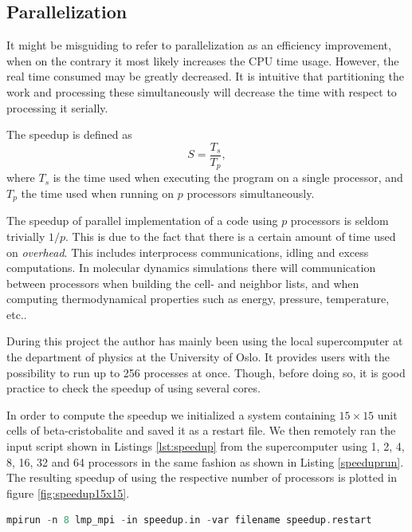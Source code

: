 \documentclass[twoside,english]{uiofysmaster}
\begin{document}
\subsection{Parallelization}
 It might be misguiding to refer to parallelization as an efficiency improvement, when on the contrary it most likely increases the CPU time usage. However, the real time consumed may be greatly decreased. It is intuitive that partitioning the work and processing these simultaneously will decrease the time with respect to processing it serially.   
 
 
 The speedup is defined as 
 \begin{equation}
 S = \frac{T_s}{T_p},
 \end{equation}
 where $T_s$ is the time used when executing the program on a single processor, and $T_p$ the time used when running on $p$ processors simultaneously.
 
 The speedup of parallel implementation of a code using $p$ processors is seldom trivially $1/p$. This is due to the fact that there is a certain amount of time used on \textit{overhead}. This includes interprocess communications, idling and excess computations.
 In molecular dynamics simulations there will communication between processors when building the cell- and neighbor lists, and when computing thermodynamical properties such as energy, pressure, temperature, etc.. 

During this project the author has mainly been using the local supercomputer at the department of physics at the University of Oslo. It provides users with the possibility to run  up to 256 processes at once. Though, before doing so, it is good practice to check the speedup of using several cores.

In order to compute the speedup we initialized a system containing $15\times15$ unit cells of beta-cristobalite and saved it as a restart file. We then remotely ran the input script shown in Listings \ref{lst:speedup} from the supercomputer using 1, 2, 4, 8, 16, 32 and 64 processors in the same fashion as shown in Listing \ref{speeduprun}.  The resulting speedup of using the respective number of processors is plotted in figure \ref{fig:speedup15x15}.



\begin{lstlisting}[caption={Command used to excecute the input script speedup.in on 8 parallel processors and set the filename variable to speedup.restart.}, label={speeduprun}, language=c++]
mpirun -n 8 lmp_mpi -in speedup.in -var filename speedup.restart
\end{lstlisting}
\end{document}
